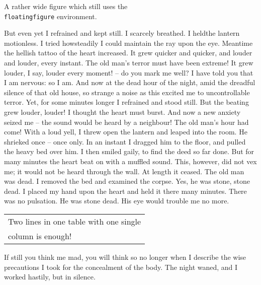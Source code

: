 \documentclass[11pt]{article}
\begin{document}
\begin{floatingfigure}[p]{90mm}
\begin{center}
A rather wide figure which still uses the \\
\texttt{floatingfigure} environment.
\end{center}
\caption{A \texttt{floatingfigure} environment
which uses \texttt{90mm} for \textit{width} and
the \texttt{p} \textit{option}.}
\end{floatingfigure}
But even yet I refrained and kept still. I scarcely\linebreak
brea\-thed. I held\linebreak the lantern motionless. I tried
how\linebreak stead\-ily I could\linebreak
maintain the ray upon the eye.
Meantime the hellish tattoo of the heart increased.
It grew quicker and quicker, and louder and louder,
every instant. The old man's terror must have
been extreme! It grew louder, I say, louder every
moment! -- do you mark me well? I have told you
that I am nervous: so I am. And now at the dead
hour of the night, amid the dreadful silence of that
old house, so strange a noise as this excited me to
uncontrollable terror. Yet, for some minutes longer
I refrained and stood still. But the beating grew
louder, louder! I thought the heart must burst.
And now a new anxiety seized me -- the sound would
be heard by a neighbour! The old man's hour had
come! With a loud yell, I threw open the lantern
and leaped into the room. He shrieked once -- once
only. In an instant I dragged him to the floor, and
pulled the heavy bed over him. I then smiled
gaily, to find the deed so far done. But for many
minutes the heart beat on with a muffled sound.
This, however, did not vex me; it would not be
heard through the wall. At length it ceased. The
old man was dead. I removed the bed and examined
the corpse. Yes, he was stone, stone dead. I placed
my hand upon the heart and held it there many
minutes. There was no pulsation. He was stone
dead. His eye would trouble me no more.

\begin{floatingtable}[r]{
\begin{tabular}{l}
Two lines in one table with one single \\
column is enough!
\end{tabular}}
\caption{This \texttt{floatingtable}  uses the \texttt{r}
\textit{option}.}
\end{floatingtable}
If still you think me mad, you will think so no
longer when I describe the wise precautions I took
for the concealment of the body. The night waned,
and I worked hastily, but in silence.
\end{document}
